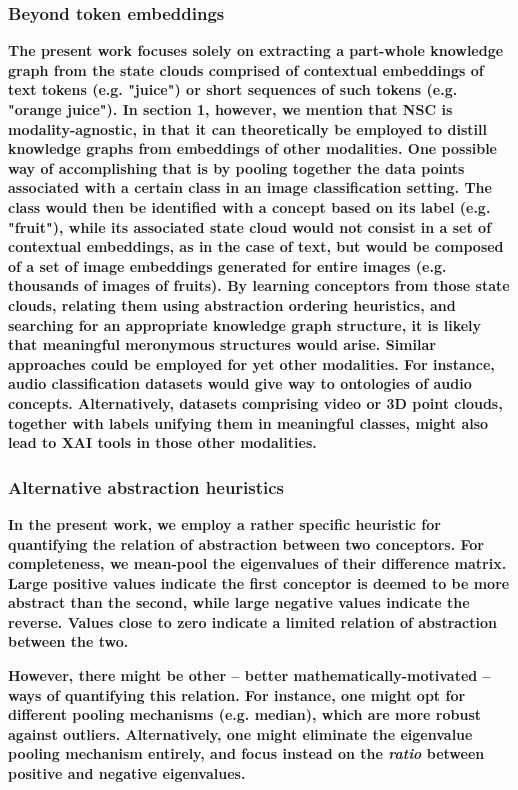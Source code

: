 \subsubsection{Beyond token embeddings}

\textbf{The present work focuses solely on extracting a part-whole knowledge graph from the state clouds comprised of contextual embeddings of text tokens (e.g. "juice") or short sequences of such tokens (e.g. "orange juice"). In section 1, however, we mention that NSC is modality-agnostic, in that it can theoretically be employed to distill knowledge graphs from embeddings of other modalities. One possible way of accomplishing that is by pooling together the data points associated with a certain class in an image classification setting. The class would then be identified with a concept based on its label (e.g. "fruit"), while its associated state cloud would not consist in a set of contextual embeddings, as in the case of text, but would be composed of a set of image embeddings generated for entire images (e.g. thousands of images of fruits). By learning conceptors from those state clouds, relating them using abstraction ordering heuristics, and searching for an appropriate knowledge graph structure, it is likely that meaningful meronymous structures would arise. Similar approaches could be employed for yet other modalities. For instance, audio classification datasets would give way to ontologies of audio concepts. Alternatively, datasets comprising video or 3D point clouds, together with labels unifying them in meaningful classes, might also lead to XAI tools in those other modalities.}

\subsubsection{Alternative abstraction heuristics}

\textbf{In the present work, we employ a rather specific heuristic for quantifying the relation of abstraction between two conceptors. For completeness, we mean-pool the eigenvalues of their difference matrix. Large positive values indicate the first conceptor is deemed to be more abstract than the second, while large negative values indicate the reverse. Values close to zero indicate a limited relation of abstraction between the two.}

\textbf{However, there might be other -- better mathematically-motivated -- ways of quantifying this relation. For instance, one might opt for different pooling mechanisms (e.g. median), which are more robust against outliers. Alternatively, one might eliminate the eigenvalue pooling mechanism entirely, and focus instead on the \textit{ratio} between positive and negative eigenvalues.}

